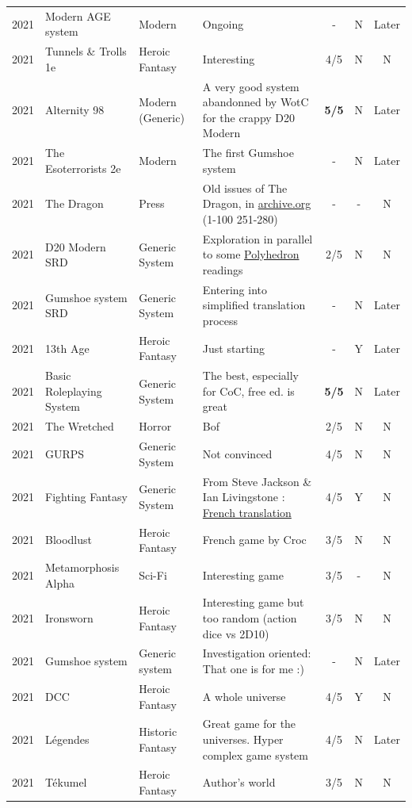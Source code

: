\documentclass[a4paper, 11pt, twoside]{article}
\begin{document}
\begin{longtable}{cp{2cm}p{1.5cm}p{7cm}ccc}
2021 & Modern AGE system & Modern & Ongoing & - & N & Later\\
2021 & Tunnels \& Trolls 1e & Heroic Fantasy & Interesting & 4/5 & N & N\\
2021 & Alternity 98 & Modern (Generic) & A very good system abandonned by WotC for the crappy D20 Modern & \textbf{5/5} & N & Later\\
2021 & The Esoterrorists 2e & Modern & The first Gumshoe system & - & N & Later\\
2021 & The Dragon & Press & Old issues of The Dragon, in \href{https://archive.org/details/DragonMagazine045\_201903}{archive.org} (1-100 251-280) & - & - & N\\
2021 & D20 Modern SRD & Generic System & Exploration in parallel to some \href{https://archive.org/details/Polyhedron105}{Polyhedron} readings & 2/5 & N & N\\
2021 & Gumshoe system SRD & Generic System & Entering into simplified translation process & - & N & Later\\
2021 & 13th Age & Heroic Fantasy & Just starting & - & Y & Later\\
2021 & Basic Roleplaying System & Generic System & The best, especially for CoC, free ed. is great & \textbf{5/5} & N & Later\\
2021 & The Wretched & Horror & Bof & 2/5 & N & N\\
2021 & GURPS & Generic System & Not convinced & 4/5 & N & N\\
2021 & Fighting Fantasy & Generic System & From Steve Jackson \& Ian Livingstone : \href{https://github.com/orey/jdr/tree/master/FightingFantasys-fr}{French translation} & 4/5 & Y & N\\
2021 & Bloodlust & Heroic Fantasy & French game by Croc & 3/5 & N & N\\
2021 & Metamorphosis Alpha & Sci-Fi & Interesting game & 3/5 & - & N\\
2021 & Ironsworn & Heroic Fantasy & Interesting game but too random (action dice vs 2D10) & 3/5 & N & N\\
2021 & Gumshoe system & Generic system & Investigation oriented: That one is for me :) & - & N & Later\\
2021 & DCC & Heroic Fantasy & A whole universe & 4/5 & Y & N\\
2021 & Légendes & Historic Fantasy & Great game for the universes. Hyper complex game system & 4/5 & N & Later\\
2021 & Tékumel & Heroic Fantasy & Author's world & 3/5 & N & N\\

\end{longtable}
\end{document}
